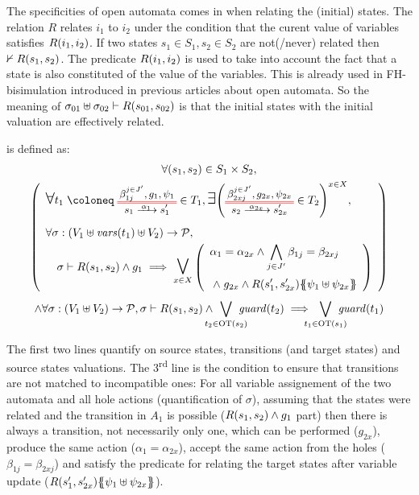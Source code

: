 \documentclass{article}
\begin{document}
The specificities of open automata comes in when relating the (initial) states.
The relation \(R\) relates \(i_1\) to \(i_2\) under the condition that the curent value of variables satisfies \(R{\left(i_1, i_2\right)}\).
If two states \(s_1 \in S_1, s_2 \in S_2\) are not(/never) related then \(\nvdash R{\left(s_1, s_2\right)}\).
The predicate \(R{\left(i_1, i_2\right)}\) is used to take into account the fact that a state is also constituted of the value of the variables.
This is already used in FH-bisimulation introduced in previous articles about open automata.
So the meaning of \(\sigma_{01} \uplus \sigma_{02} \vdash R{\left(s_{01}, s_{02}\right)}\) is that the initial states with the initial valuation are effectively related.
\begin{defi}
 is defined as: %
\begin{multline*}
	\forall \mpar{s_1, s_2} \in S_1 \times S_2, \\
	\mpar{\everymath{\displaystyle}\begin{array}{l}
		\bigsymb{\forall} t_1 \defobject \OTx{1}{}{1}{} \in T_1, \bigsymb{\exists} \mpar{\OTx{2}{x}{2x}{} \in T_2}^{x \in X}, \\[12pt]
		\forall \sigma: \mpar{V_1 \uplus \fvars{t_1} \uplus V_2} \to \values, \\
		\quad \sigma \vdash R\mpar{s_1, s_2} \wedge g_1 \implies \operatorname*{\bigsymb{\bigvee}}_{x \in X} \mpar{\begin{array}{l}
			\alpha_1 = \alpha_{2x} \wedge \bigwedge_{j \in J'} \beta_{1j} = \beta_{2xj} \\[12pt]
			\nwedge g_{2x} \wedge R\mpar{s'_1, s'_{2x}}\psubst{\psi_1 \uplus \psi_{2x}}
		\end{array}} \\[12pt]
	\end{array}} \\
	\wedge \forall \sigma: \mpar{V_1 \uplus V_2} \to \values, \sigma \vdash R\mpar{s_1, s_2} \wedge \bigvee_\subbox{t_2 \in \fOT{s_2}} \fguard{t_2} \implies \bigvee_\subbox{t_1 \in \fOT{s_1}} \fguard{t_1}
\end{multline*}
\end{defi}
The first two lines quantify on source states, transitions (and target states) and source states valuations.
The 3\textsuperscript{rd} line is the condition to ensure that transitions are not matched to incompatible ones:
For all variable assignement of the two automata and all hole actions (quantification of \(\sigma\)), assuming that the states were related and the transition in \(A_1\) is possible (\(R{\left(s_1, s_2\right)} \wedge g_1\) part) then there is always a transition, not necessarily only one, which can be performed (\(g_{2x}\)), produce the same action (\(\alpha_1 = \alpha_{2x}\)), accept the same action from the holes (\(\beta_{1j} = \beta_{2xj}\)) and satisfy the predicate for relating the target states after variable update (\(R{\left(s'_1, s'_{2x}\right)}{\left\{\!\!{\left\{\psi_1 \uplus \psi_{2x}\right\}}\!\!\right\}}\)).
\end{document}
